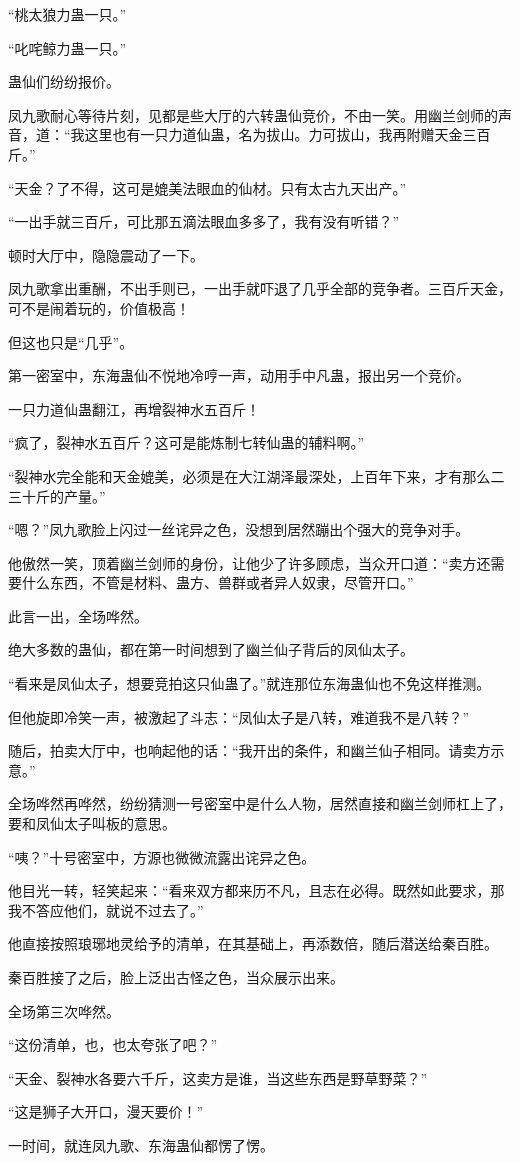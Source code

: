 \begin{this_body}
“桃太狼力蛊一只。”

“叱咤鲸力蛊一只。”

蛊仙们纷纷报价。

凤九歌耐心等待片刻，见都是些大厅的六转蛊仙竞价，不由一笑。用幽兰剑师的声音，道：“我这里也有一只力道仙蛊，名为拔山。力可拔山，我再附赠天金三百斤。”

“天金？了不得，这可是媲美法眼血的仙材。只有太古九天出产。”

“一出手就三百斤，可比那五滴法眼血多多了，我有没有听错？”

顿时大厅中，隐隐震动了一下。

凤九歌拿出重酬，不出手则已，一出手就吓退了几乎全部的竞争者。三百斤天金，可不是闹着玩的，价值极高！

但这也只是“几乎”。

第一密室中，东海蛊仙不悦地冷哼一声，动用手中凡蛊，报出另一个竞价。

一只力道仙蛊翻江，再增裂神水五百斤！

“疯了，裂神水五百斤？这可是能炼制七转仙蛊的辅料啊。”

“裂神水完全能和天金媲美，必须是在大江湖泽最深处，上百年下来，才有那么二三十斤的产量。”

“嗯？”凤九歌脸上闪过一丝诧异之色，没想到居然蹦出个强大的竞争对手。

他傲然一笑，顶着幽兰剑师的身份，让他少了许多顾虑，当众开口道：“卖方还需要什么东西，不管是材料、蛊方、兽群或者异人奴隶，尽管开口。”

此言一出，全场哗然。

绝大多数的蛊仙，都在第一时间想到了幽兰仙子背后的凤仙太子。

“看来是凤仙太子，想要竞拍这只仙蛊了。”就连那位东海蛊仙也不免这样推测。

但他旋即冷笑一声，被激起了斗志：“凤仙太子是八转，难道我不是八转？”

随后，拍卖大厅中，也响起他的话：“我开出的条件，和幽兰仙子相同。请卖方示意。”

全场哗然再哗然，纷纷猜测一号密室中是什么人物，居然直接和幽兰剑师杠上了，要和凤仙太子叫板的意思。

“咦？”十号密室中，方源也微微流露出诧异之色。

他目光一转，轻笑起来：“看来双方都来历不凡，且志在必得。既然如此要求，那我不答应他们，就说不过去了。”

他直接按照琅琊地灵给予的清单，在其基础上，再添数倍，随后潜送给秦百胜。

秦百胜接了之后，脸上泛出古怪之色，当众展示出来。

全场第三次哗然。

“这份清单，也，也太夸张了吧？”

“天金、裂神水各要六千斤，这卖方是谁，当这些东西是野草野菜？”

“这是狮子大开口，漫天要价！”

一时间，就连凤九歌、东海蛊仙都愣了愣。

\end{this_body}

